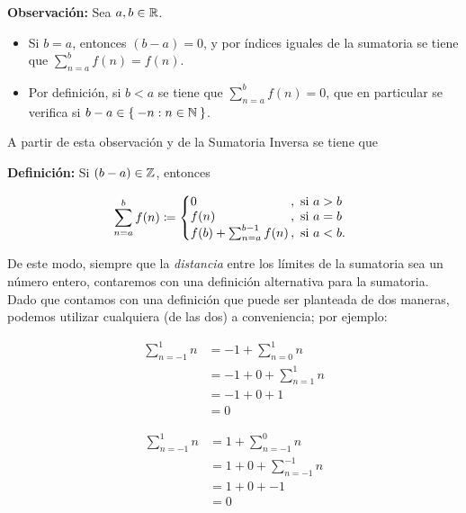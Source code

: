     \textbf{Observación:} Sea $a,b\in \mathbb{R}$.
    \vspace{-1em}\begin{itemize}
      \item Si $b=a$, entonces $(b-a)=0$, y por índices iguales de la sumatoria se tiene que $\sum_{n=a}^{b} f(n) = f(n)$.
      \item Por definición, si $b<a$ se tiene que $\sum_{n=a}^{b} f(n) =0$, que en particular se verifica si $b-a\in \Set{-n:n\in \mathbb{N}}$.
    \end{itemize}\vspace{-1em}
    A partir de esta observación y de la Sumatoria Inversa se tiene que

    \textbf{Definición:} Si $(b-a)\in \mathbb{Z}$, entonces

    \[\sum_{n=a}^{b} f(n) \defined \left\{
    \begin{array}{@{}l@{\thinspace}l}
      0 &,  \ \text{si}  \ a>b\\
      f(n) &,  \ \text{si}  \ a=b\\
      f(b) + \sum_{n=a}^{b-1} f(n) &,  \ \text{si}  \ a<b.
    \end{array} \right. \]

    De este modo, siempre que la \textit{distancia} entre los límites de la sumatoria sea un número entero, contaremos con una definición alternativa para la sumatoria. Dado que contamos con una definición que puede ser planteada de dos maneras, podemos utilizar cualquiera (de las dos) a conveniencia; por ejemplo:
\begin{center}
  \begin{minipage}[c]{.5\linewidth}
    \begin{align*}
      \sum_{n=-1}^{1} n &= -1 + \sum_{n=0}^{1} n\\
      &= -1 + 0 + \sum_{n=1}^1 n\\
      &= -1 + 0 + 1\\
      &= 0
    \end{align*}
   \end{minipage}%
  \begin{minipage}[c]{.5\linewidth}
    \begin{align*}
      \sum_{n=-1}^{1} n &= 1 + \sum_{n=-1}^{0} n\\
      &= 1 + 0 + \sum_{n=-1}^{-1} n\\
      &= 1 + 0 + -1\\
      &= 0
    \end{align*}
  \end{minipage}
  \end{center}


